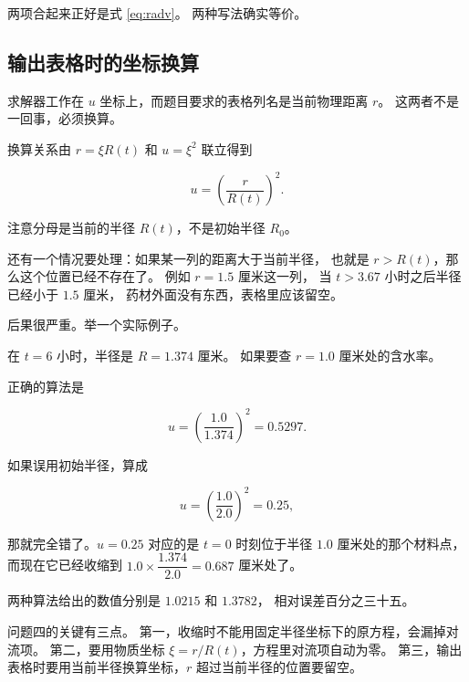 两项合起来正好是式 \eqref{eq:radv}。
两种写法确实等价。

\subsection{输出表格时的坐标换算}

求解器工作在 $u$ 坐标上，而题目要求的表格列名是当前物理距离 $r$。
这两者不是一回事，必须换算。

换算关系由 $r=\xi R(t)$ 和 $u=\xi^2$ 联立得到

\begin{equation}
u = \left(\frac{r}{R(t)}\right)^2 .
\label{eq:outputmap}
\end{equation}

注意分母是当前的半径 $R(t)$，不是初始半径 $R_0$。

还有一个情况要处理：如果某一列的距离大于当前半径，
也就是 $r>R(t)$，那么这个位置已经不存在了。
例如 $r=1.5$ 厘米这一列，
当 $t>3.67$ 小时之后半径已经小于 $1.5$ 厘米，
药材外面没有东西，表格里应该留空。

后果很严重。举一个实际例子。

在 $t=6$ 小时，半径是 $R=1.374$ 厘米。
如果要查 $r=1.0$ 厘米处的含水率。

正确的算法是

\begin{equation}
u = \left(\frac{1.0}{1.374}\right)^2 = 0.5297 .
\end{equation}

如果误用初始半径，算成

\begin{equation}
u = \left(\frac{1.0}{2.0}\right)^2 = 0.25 ,
\end{equation}

那就完全错了。$u=0.25$ 对应的是 $t=0$ 时刻位于半径 $1.0$ 厘米处的那个材料点，
而现在它已经收缩到 $1.0\times\dfrac{1.374}{2.0}=0.687$ 厘米处了。

两种算法给出的数值分别是 $1.0215$ 和 $1.3782$，
相对误差百分之三十五。

\keypoint
问题四的关键有三点。
第一，收缩时不能用固定半径坐标下的原方程，会漏掉对流项。
第二，要用物质坐标 $\xi=r/R(t)$，方程里对流项自动为零。
第三，输出表格时要用当前半径换算坐标，$r$ 超过当前半径的位置要留空。
